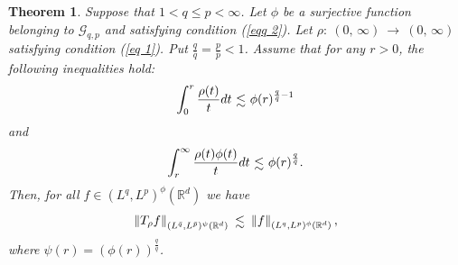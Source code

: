 \documentclass[10pt,a4paper]{amsart}
\numberwithin{equation}{section}
\newtheorem{theorem}{Theorem}[section]
\numberwithin{equation}{section}
\def\lsim{\raisebox{-1ex}{$~\stackrel{\textstyle <}{\sim}~$}}
\begin{document}
\begin{theorem}\label{theo 4}
Suppose that $1 < q\leq p < \infty$. Let $\phi$ be a surjective function belonging to $ \mathcal{G}_{q,p}$ and satisfying condition (\ref{eqq 2}). Let  $\rho : \: (0,\, \infty) \:  \to \: (0, \,\infty) \:$ satisfying condition (\ref{eq 1}).  
 Put $\frac{q}{\bar{q}} = \frac{p}{\bar{p}}<1$.
Assume that for any $r > 0$, the following inequalities hold:
\begin{equation}\label{eq 8}
\displaystyle\int_{0}^{r} \frac{\rho(t)}{t} dt \lsim  \phi(r)^{\frac{q}{\bar{q}}-1}
\end{equation}
and 
\begin{equation}\label{eq 9}
\displaystyle\int_{r}^{\infty} \frac{\rho(t)\phi(t)}{t} dt \lsim  \phi(r)^{\frac{q}{\bar{q}}}.
\end{equation}
 Then, for all  $f \in (L^{q},L^{p})^{\phi}(\mathbb{R}^{d})$ we have
 $$\left\Vert T_{\rho}f \right\Vert_{(L^{\bar{q}},L^{\bar{p}})^{\psi}(\mathbb{R}^{d})} \lsim  \left\Vert f  \right\Vert_{(L^{q},L^{p})^{\phi}(\mathbb{R}^{d})},$$ where  $\psi(r)= (\phi(r))^{\frac{q}{\bar{q}}}$.
\end{theorem}
\end{document}
